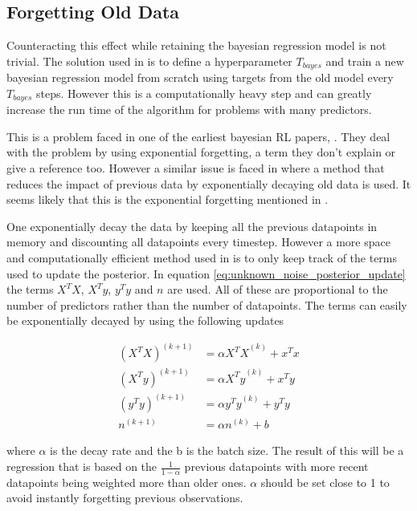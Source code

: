 \subsection{Forgetting Old Data}

Counteracting this effect while retaining the bayesian regression model is not trivial. The solution used in \cite{azziz_2018} is to define a hyperparameter $T_{bayes}$ and train a new bayesian regression model from scratch using targets from the old model every $T_{bayes}$ steps. However this is a computationally heavy step and can greatly increase the run time of the algorithm for problems with many predictors. 

This is a problem faced in one of the earliest bayesian RL papers, \cite{dearden_1998}. They deal with the problem by using exponential forgetting, a term they don't explain or give a reference too. However a similar issue is faced in \cite{ting_2007} where a method that reduces the impact of previous data by exponentially decaying old data is used. It seems likely that this is the exponential forgetting mentioned in \cite{dearden_1998}.

One exponentially decay the data by keeping all the previous datapoints in memory and discounting all datapoints every timestep. However a more space and computationally efficient method used in \cite{ting_2007} is to only keep track of the terms used to update the posterior. In equation \ref{eq:unknown_noise_posterior_update} the terms $X^TX$, $X^Ty$, $y^Ty$ and $n$ are used. All of these are proportional to the number of predictors rather than the number of datapoints. The terms can easily be exponentially decayed by using the following updates 

\begin{align}
    (X^TX)^{(k+1)} &= \alpha{X^TX}^{(k)} + x^Tx \\
    (X^Ty)^{(k+1)} &= \alpha{X^Ty}^{(k)} + x^Ty \\
    (y^Ty)^{(k+1)} &= \alpha{y^Ty}^{(k)} + y^Ty \\
    n^{(k+1)} &= \alpha n^{(k)} + b 
    \label{eq:exponential_forgetting}
\end{align}

where $\alpha$ is the decay rate and the b is the batch size. The result of this will be a regression that is based on the $\frac{1}{1-\alpha}$ previous datapoints with more recent datapoints being weighted more than older ones. $\alpha$ should be set close to 1 to avoid instantly forgetting previous observations.

